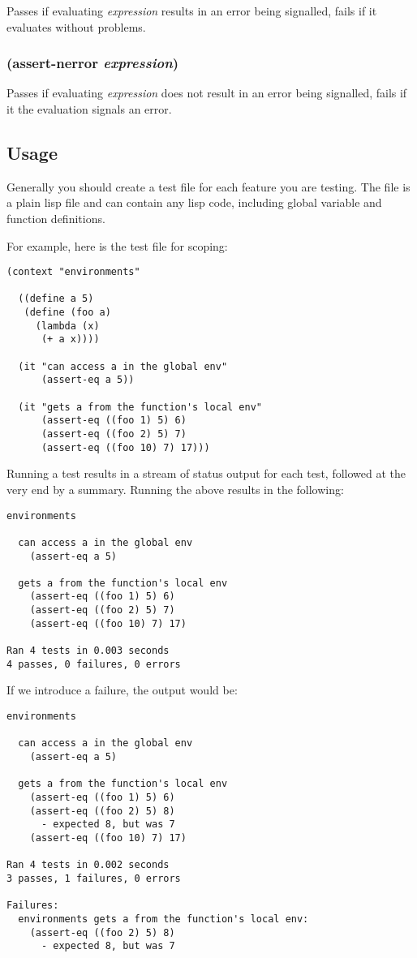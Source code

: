 \documentclass{article}
\begin{document}
Passes if evaluating \emph{expression} results in an error being signalled, fails if it
evaluates without problems.

\subsubsection{(assert-nerror \emph{expression})}

Passes if evaluating \emph{expression} does not result in an error being signalled, fails if
it the evaluation signals an error.

\subsection{Usage}\label{sec:usage}

Generally you should create a test file for each feature you are testing. The file is a plain
lisp file and can contain any lisp code, including global variable and function definitions.

For example, here is the test file for scoping:

\begin{verbatim}
(context "environments"

  ((define a 5)
   (define (foo a)
     (lambda (x)
      (+ a x))))

  (it "can access a in the global env"
      (assert-eq a 5))

  (it "gets a from the function's local env"
      (assert-eq ((foo 1) 5) 6)
      (assert-eq ((foo 2) 5) 7)
      (assert-eq ((foo 10) 7) 17)))
\end{verbatim}

Running a test results in a stream of status output for each test, followed at the very end by
a summary. Running the above results in the following:

\begin{verbatim}
environments

  can access a in the global env
    (assert-eq a 5)

  gets a from the function's local env
    (assert-eq ((foo 1) 5) 6)
    (assert-eq ((foo 2) 5) 7)
    (assert-eq ((foo 10) 7) 17)

Ran 4 tests in 0.003 seconds
4 passes, 0 failures, 0 errors
\end{verbatim}

If we introduce a failure, the output would be:

\begin{verbatim}
environments

  can access a in the global env
    (assert-eq a 5)

  gets a from the function's local env
    (assert-eq ((foo 1) 5) 6)
    (assert-eq ((foo 2) 5) 8)
      - expected 8, but was 7
    (assert-eq ((foo 10) 7) 17)

Ran 4 tests in 0.002 seconds
3 passes, 1 failures, 0 errors

Failures:
  environments gets a from the function's local env:
    (assert-eq ((foo 2) 5) 8)
      - expected 8, but was 7
\end{verbatim}
\end{document}
